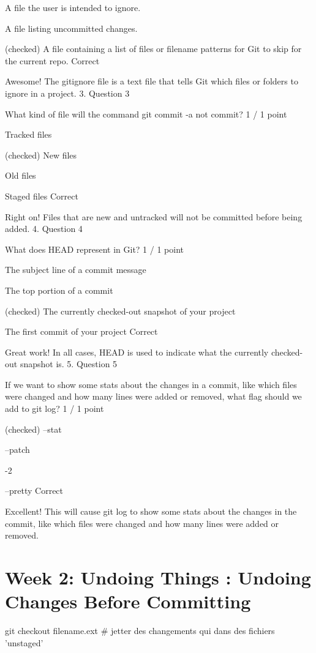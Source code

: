 \documentclass[11pt, onecolumn]{article}
\begin{document}
A file the user is intended to ignore.

A file listing uncommitted changes.

(checked) A file containing a list of files or filename patterns for Git to skip for the current repo.
Correct

Awesome! The gitignore file is a text file that tells Git which files or folders to ignore in a project.
3.
Question 3

What kind of file will the command git commit -a not commit?
1 / 1 point

Tracked files

(checked) New files

Old files

Staged files
Correct

Right on! Files that are new and untracked will not be committed before being added.
4.
Question 4

What does HEAD represent in Git?
1 / 1 point

The subject line of a commit message

The top portion of a commit

(checked) The currently checked-out snapshot of your project

The first commit of your project
Correct

Great work! In all cases, HEAD is used to indicate what the currently checked-out snapshot is.
5.
Question 5

If we want to show some stats about the changes in a commit, like which files were changed and how many lines were added or removed, what flag should we add to git log?
1 / 1 point

(checked) --stat

--patch

-2

--pretty
Correct

Excellent! This will cause git log to show some stats about the changes in the commit, like which files were changed and how many lines were added or removed.


\section{Week 2: Undoing Things : Undoing Changes Before Committing}

git checkout filename.ext  # jetter des changements qui dans des fichiers 'unstaged'
\end{document}
